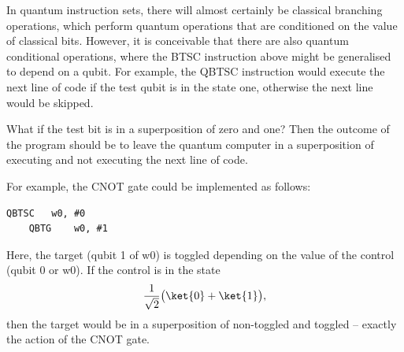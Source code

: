 In quantum instruction sets, there will almost certainly be classical branching operations, which perform quantum operations that are conditioned on the value of classical bits. However, it is conceivable that there are also quantum conditional operations, where the BTSC instruction above might be generalised to depend on a qubit. For example, the QBTSC instruction would execute the next line of code if the test qubit is in the state one, otherwise the next line would be skipped.

What if the test bit is in a superposition of zero and one? Then the outcome of the program should be to leave the quantum computer in a superposition of executing and not executing the next line of code.

For example, the CNOT gate could be implemented as follows:
\begin{lstlisting}[language=Asm]
    QBTSC   w0, #0
    QBTG    w0, #1
\end{lstlisting}
Here, the target (qubit 1 of w0) is toggled depending on the value of the control (qubit 0 or w0). If the control is in the state $$\frac{1}{\sqrt{2}}\big(\ket{0}+\ket{1}\big),$$ then the target would be in a superposition of non-toggled and toggled -- exactly the action of the CNOT gate. 

